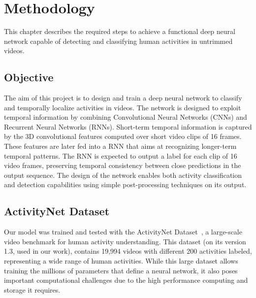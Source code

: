 \chapter{Methodology}

This chapter describes the required steps to achieve a functional deep neural network capable of detecting and classifying human activities in untrimmed videos.

\section{Objective}

The aim of this project is to design and train a deep neural network to classify and temporally localize activities in videos. The network is designed to exploit temporal information by combining Convolutional Neural Networks (CNNs) and Recurrent Neural Networks (RNNs). Short-term temporal information is captured by the 3D convolutional features computed over short video clips of 16 frames.
These features are later fed into a RNN that aims at recognizing longer-term temporal patterns. The RNN is expected to output a label for each clip of 16 video frames, preserving temporal consistency between close predictions in the output sequence. The design of the network enables both activity classification and detection capabilities using simple post-processing techniques on its output.

\section{ActivityNet Dataset}

Our model was trained and tested with the ActivityNet Dataset~\cite{caba2015activitynet}, a large-scale video benchmark for human activity understanding. This dataset (on its version 1.3, used in our work), contains 19,994 videos with different 200 activities labeled, representing a wide range of human activities. While this large dataset allows training the millions of parameters that define a neural network, it also poses important computational challenges due to the high performance computing and storage it requires.

